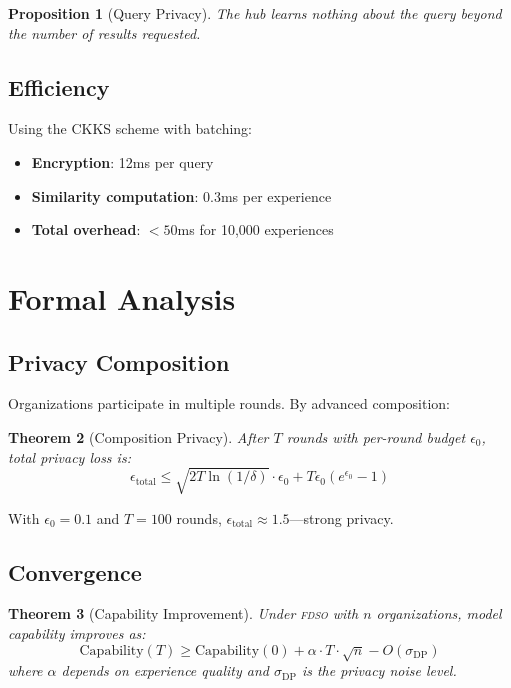 \documentclass[11pt,letterpaper]{article}
\newtheorem{theorem}{Theorem}[section]
\newtheorem{proposition}[theorem]{Proposition}
\newcommand{\FDSO}{\textsc{fdso}}
\begin{document}
\begin{proposition}[Query Privacy]
The hub learns nothing about the query beyond the number of results requested.
\end{proposition}

\subsection{Efficiency}

Using the CKKS scheme with batching:
\begin{itemize}
    \item \textbf{Encryption}: 12ms per query
    \item \textbf{Similarity computation}: 0.3ms per experience
    \item \textbf{Total overhead}: $<50$ms for 10,000 experiences
\end{itemize}

\section{Formal Analysis}
\label{sec:analysis}

\subsection{Privacy Composition}

Organizations participate in multiple rounds. By advanced composition:

\begin{theorem}[Composition Privacy]
After $T$ rounds with per-round budget $\epsilon_0$, total privacy loss is:
\begin{equation}
\epsilon_{\text{total}} \leq \sqrt{2T \ln(1/\delta)} \cdot \epsilon_0 + T\epsilon_0(e^{\epsilon_0} - 1)
\end{equation}
\end{theorem}

With $\epsilon_0 = 0.1$ and $T = 100$ rounds, $\epsilon_{\text{total}} \approx 1.5$---strong privacy.

\subsection{Convergence}

\begin{theorem}[Capability Improvement]
Under \FDSO{} with $n$ organizations, model capability improves as:
\begin{equation}
\text{Capability}(T) \geq \text{Capability}(0) + \alpha \cdot T \cdot \sqrt{n} - O(\sigma_{\text{DP}})
\end{equation}
where $\alpha$ depends on experience quality and $\sigma_{\text{DP}}$ is the privacy noise level.
\end{theorem}
\end{document}

